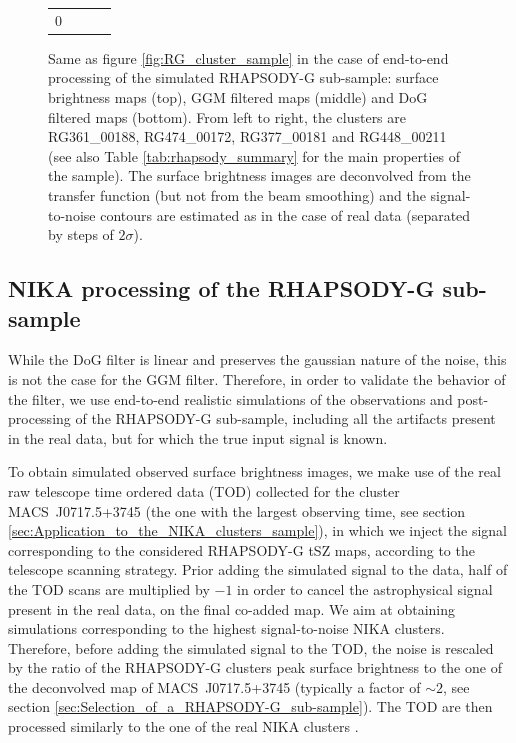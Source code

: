 \documentclass[twocolumn,traditabstract]{aa}
\begin{document}
\begin{figure}[h]
{\begin{tabular}{llll}
0}{\LARGE mJy/beam}}}
\end{tabular}
}
\caption{\footnotesize{Same as figure \ref{fig:RG_cluster_sample} in the case of end-to-end processing of the simulated RHAPSODY-G sub-sample: surface brightness maps (top), GGM filtered maps (middle) and DoG filtered maps (bottom). From left to right, the clusters are RG361\_00188, RG474\_00172, RG377\_00181 and RG448\_00211 (see also Table \ref{tab:rhapsody_summary} for the main properties of the sample). The surface brightness images are deconvolved from the transfer function (but not from the beam smoothing) and the signal-to-noise contours are estimated as in the case of real data (separated by steps of $2 \sigma$).}}
\label{fig:RG_cluster_sample_proc}
\end{figure}

\subsection{NIKA processing of the RHAPSODY-G sub-sample}
While the DoG filter is linear and preserves the gaussian nature of the noise, this is not the case for the GGM filter. Therefore, in order to validate the behavior of the filter, we use end-to-end realistic simulations of the observations and post-processing of the RHAPSODY-G sub-sample, including all the artifacts present in the real data, but for which the true input signal is known.

To obtain simulated observed surface brightness images, we make use of the real raw telescope time ordered data (TOD) collected for the cluster \mbox{MACS~J0717.5+3745} (the one with the largest observing time, see section \ref{sec:Application_to_the_NIKA_clusters_sample}), in which we inject the signal corresponding to the considered RHAPSODY-G tSZ maps, according to the telescope scanning strategy. Prior adding the simulated signal to the data, half of the TOD scans are multiplied by $-1$ in order to cancel the astrophysical signal present in the real data, on the final co-added map. We aim at obtaining simulations corresponding to the highest signal-to-noise NIKA clusters. Therefore, before adding the simulated signal to the TOD, the noise is rescaled by the ratio of the RHAPSODY-G clusters peak surface brightness to the one of the deconvolved map of \mbox{MACS~J0717.5+3745} (typically a factor of $\sim 2$, see section \ref{sec:Selection_of_a_RHAPSODY-G_sub-sample}). The TOD are then processed similarly to the one of the real NIKA clusters \citep[see][for more details]{Adam2015}. 
\end{document}
